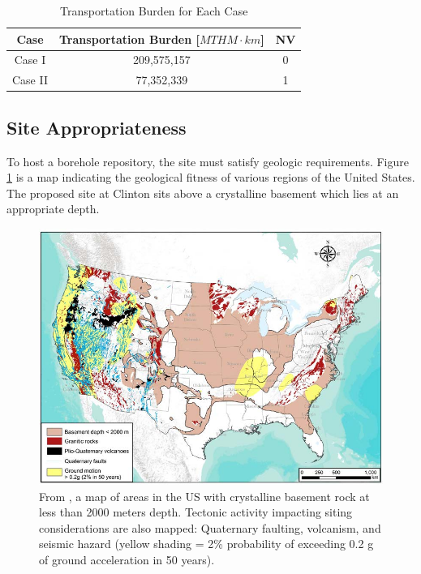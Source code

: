 \begin{table}[h]
	\centering
        \caption {Transportation Burden for Each Case}
		\begin{tabular}{|c|c|c|}
			\hline
			Case & Transportation Burden [$MTHM\cdot km$] & NV\\
			\hline
			Case I & 209,575,157  & 0\\
			Case II & 77,352,339 & 1 \\
                        \hline
                \end{tabular}
\end{table}
  

 \subsection{Site Appropriateness} 

  To host a borehole repository, the site must satisfy geologic requirements. 
  Figure \ref{fig:cbrock} is a map indicating the geological fitness of various 
  regions of the United States. The proposed site at Clinton sits above 
  a crystalline basement which lies at an appropriate depth.

\begin{figure}[!h] 
  \centering
  \includegraphics[width=0.8\columnwidth]{cbrock.png}	
        \caption{From \cite{perry_gis_2015}, a map of areas in the US with 
        crystalline basement rock at less than 2000 meters depth. Tectonic 
        activity impacting siting considerations are also mapped:  Quaternary 
        faulting, volcanism, and seismic hazard (yellow shading = 2\% 
        probability of exceeding 0.2 g of ground acceleration in 50 years).}
  \label{fig:cbrock}
\end{figure}
 
